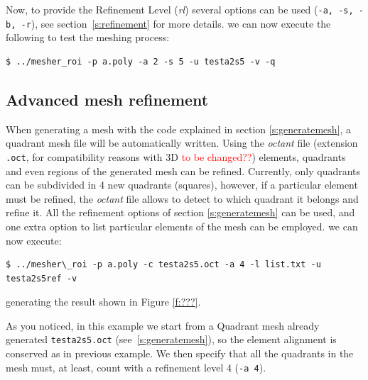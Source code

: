 \documentclass[10pt]{article}
\begin{document}
Now, to provide the Refinement Level (\textit{rl}) several options can be used (\texttt{-a, -s, -b, -r}), see section~\ref{s:refinement} for more details.
we can now execute the following to test the meshing process:
\begin{tcolorbox}{\small
\begin{verbatim}
$ ../mesher_roi -p a.poly -a 2 -s 5 -u testa2s5 -v -q
\end{verbatim}
}\end{tcolorbox}
\subsection{Advanced mesh refinement}
\label{s:refinemesh}

When generating a mesh with the code explained in section \ref{s:generatemesh}, a quadrant mesh file will be automatically written. Using the \textit{octant} file (extension \texttt{.oct}, for compatibility reasons with 3D \textcolor{red}{to be changed??}) elements, quadrants and even regions of the generated mesh can be refined. Currently, only quadrants can be subdivided in 4 new quadrants (squares), however, if a particular element must be refined, the \textit{octant} file allows to detect to which quadrant it belongs and refine it. All the refinement options of section \ref{s:generatemesh} can be used, and one extra option to list particular elements of the mesh can be employed.
we can now execute: 
\begin{tcolorbox}{\small
\begin{verbatim}
$ ../mesher\_roi -p a.poly -c testa2s5.oct -a 4 -l list.txt -u testa2s5ref -v
\end{verbatim}
}\end{tcolorbox}
generating the result shown in Figure \ref{f:???}.

As you noticed, in this example we start from a Quadrant mesh already generated \texttt{testa2s5.oct} (see~\ref{s:generatemesh}), so the element alignment is conserved as in previous example. We then specify that all the quadrants in the mesh must, at least, count with a refinement level 4 (\texttt{-a 4}). 
\end{document}
